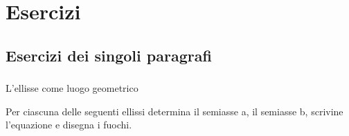 


\section{Esercizi}

\subsection{Esercizi dei singoli paragrafi}

\subsubsection*{}


% 

L'ellisse come luogo geometrico
\begin{esercizio}
  \label{ese:div.003}
  Per ciascuna delle seguenti ellissi determina il semiasse a, il 
semiasse b, scrivine l'equazione e disegna i fuochi.

\noindent \ellisseesea \ellisseeseb \ellisseesec
\end{esercizio}

\subsubsection*{}


